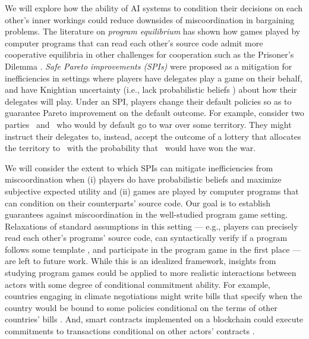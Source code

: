 \documentclass[sigconf]{aamas}
\theoremstyle{definition}
\begin{document}
\par We will explore
how the ability of AI systems to condition 
their decisions on each other's inner workings
could reduce downsides
of
miscoordination
in
bargaining problems.
The literature on \textit{program 
equilibrium} 
has shown how games played by computer programs 
that can read each other's source code admit more cooperative equilibria
in other challenges for cooperation such as the Prisoner's Dilemma
\citep{tennenholtz2004program,lavictoire2014program,oesterheld2019robust}.
\textit{Safe Pareto improvements 
(SPIs)} \citep{oesterheld2021safe} were proposed 
as a mitigation for inefficiencies in settings where
players have delegates play a game on their behalf, 
and have Knightian uncertainty (i.e., lack probabilistic beliefs
\citep{knight1921risk})
about how their delegates will play. 
Under an SPI, players 
change
their
default policies so as to guarantee Pareto improvement on the 
default outcome. For example, consider two parties~\A{} and~\B{} who would by default go to war over some territory.
They might instruct their delegates to,
instead, accept the outcome
of a lottery that allocates the territory
to~\A{} with the probability that~\A{}
would have won the war.

We will consider the extent to which SPIs 
can
mitigate
inefficiencies from
miscoordination when (i) players
do have probabilistic beliefs and
maximize subjective expected utility
and (ii) games are played by
computer programs that can condition on their counterparts' 
source code.
Our goal is to establish
guarantees against miscoordination
in the well-studied program game setting. Relaxations of standard assumptions in this setting
--- e.g., players can precisely read each other's programs' source code,
can syntactically verify if a program
follows some template \citep{tennenholtz2004program},
and participate in the program
game in the first place --- are left to future work.
While this is an idealized framework,
insights from studying program games could be
applied to more realistic interactions
between actors with some degree of conditional commitment ability.
For example,
countries engaging in climate negotiations
might write bills that specify when the country
would be bound to some policies conditional
on the terms of other countries' bills \citep{heitzig2023improvinginternationalclimatepolicy}. 
And, smart contracts implemented on a blockchain could
execute commitments to
transactions conditional on other
actors' contracts \citep{varian2010computer,sun2023cooperativeaidecentralizedcommitment}.
\end{document}
